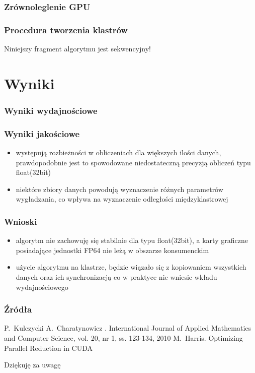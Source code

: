\documentclass{beamer}
\begin{document}
\begin{frame}\frametitle{Zrównoleglenie GPU}

\end{frame}



\begin{frame}\frametitle{Procedura tworzenia klastrów}
\begin{center}
Niniejszy fragment algorytmu jest sekwencyjny!
\end{center}
\end{frame}




\section{Wyniki}
\begin{frame}\frametitle{Wyniki wydajnościowe}

\end{frame}

\begin{frame}\frametitle{Wyniki jakościowe}
\begin{itemize}
\item występują rozbieżności w obliczeniach dla większych ilości danych, prawdopodobnie jest to spowodowane niedostateczną precyzją obliczeń typu float(32bit)
\item niektóre zbiory danych powodują wyznaczenie różnych parametrów wygładzania, co wpływa na wyznaczenie odległości międzyklastrowej
\end{itemize}
\end{frame}

\begin{frame}\frametitle{Wnioski}
\begin{itemize}
\item algorytm nie zachowuję się stabilnie dla typu float(32bit), a karty graficzne posiadające jednostki FP64 nie leżą w obszarze konsumenckim
\item użycie algorytmu na klastrze, będzie wiązało się z kopiowaniem wszystkich danych oraz ich synchronizacją co w praktyce nie wniesie wkładu wydajnościowego
\end{itemize}
\end{frame}


\begin{frame} \frametitle{Źródła}
\begin{thebibliography}{10}
\beamertemplatearticlebibitems
    P.~Kulczycki A.~Charatynowicz
    .
    \newblock International Journal of Applied Mathematics and Computer Science, vol. 20, nr 1, ss. 123-134, 2010
  \beamertemplatearticlebibitems
    M.~Harris.
    \newblock Optimizing Parallel Reduction in CUDA
\end{thebibliography}
\end{frame}

\begin{frame}
\begin{center}
\Huge Dziękuję za uwagę
\end{center}
\end{frame}
\end{document}
